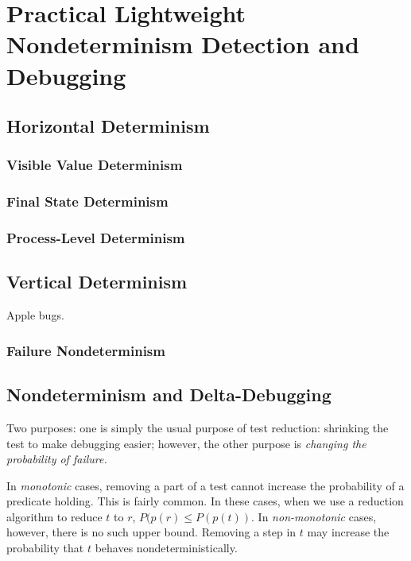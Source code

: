 \section{Practical Lightweight Nondeterminism
  Detection and Debugging}

\subsection{Horizontal Determinism}

\subsubsection{Visible Value Determinism}

\subsubsection{Final State Determinism}

\subsubsection{Process-Level Determinism}

\subsection{Vertical Determinism}

Apple bugs.

\subsubsection{Failure Nondeterminism}

\subsection{Nondeterminism and Delta-Debugging}

Two purposes:  one is simply the usual purpose of test reduction: shrinking the test to make debugging
easier; however, the other purpose is \emph{changing the probability of failure.}

In \emph{monotonic} cases, removing a part of a test cannot
increase the probability of a predicate holding.  This is fairly
common.  In these cases, when we use a reduction algorithm to reduce $t$
to $r$, $P(p(r) \leq P(p(t))$.  In \emph{non-monotonic} cases,
however, there is no such upper bound.  Removing a step in $t$ may
increase the probability that $t$ behaves nondeterministically.

